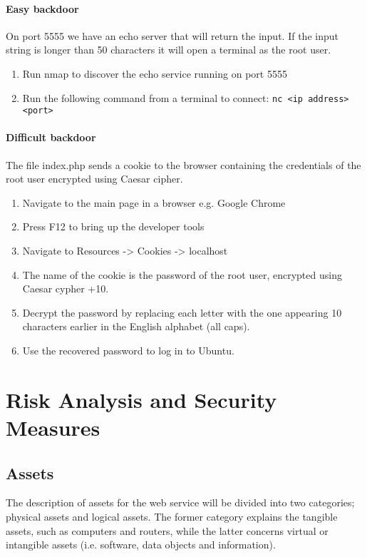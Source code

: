\documentclass{article}
\begin{document}
\paragraph{Easy backdoor}
On port 5555 we have an echo server that will return the input.
If the input string is longer than 50 characters it will open a terminal as the root user.

\begin{enumerate}
	\item Run nmap to discover the echo service running on port 5555
	\item Run the following command from a terminal to connect: \texttt{nc <ip address> <port>}
\end{enumerate}

\paragraph{Difficult backdoor}
The file index.php sends a cookie to the browser containing the credentials of the root user encrypted using Caesar cipher.

\begin{enumerate}
	\item Navigate to the main page in a browser e.g. Google Chrome
	\item Press F12 to bring up the developer tools
	\item Navigate to Resources -> Cookies -> localhost
	\item The name of the cookie is the password of the root user, encrypted using Caesar cypher +10.
	\item Decrypt the password by replacing each letter with the one appearing 10 characters earlier in the English alphabet (all caps).
	\item Use the recovered password to log in to Ubuntu.
\end{enumerate}


\section{Risk Analysis and Security Measures}

\subsection{Assets}

The description of assets for the web service will be divided into two categories; physical assets and logical assets. The former category explains the tangible assets, such as computers and routers, while the latter concerns virtual or intangible assets (i.e. software, data objects and information). 
\end{document}
